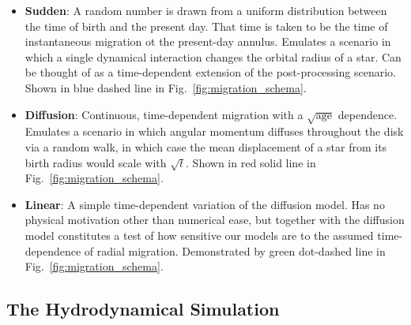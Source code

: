 \documentclass[a4paper, fleqn, usenatbib, useAMS]{mnras}
\begin{document}
\begin{itemize}
\begin{itemize}
		\item \textbf{Sudden}: A random number is drawn from a uniform 
		distribution between the time of birth and the present day. That time 
		is taken to be the time of instantaneous migration ot the present-day 
		annulus. Emulates a scenario in which a single dynamical interaction 
		changes the orbital radius of a star. Can be thought of as a 
		time-dependent extension of the post-processing scenario. Shown in 
		blue dashed line in Fig.~\ref{fig:migration_schema}. 

		\item \textbf{Diffusion}: Continuous, time-dependent migration with a 
		$\sqrt{\text{age}}$ dependence. Emulates a scenario in which angular 
		momentum diffuses throughout the disk via a random walk, in which 
		case the mean displacement of a star from its birth radius would 
		scale with $\sqrt{t}$. Shown in red solid line in 
		Fig.~\ref{fig:migration_schema}. 

		\item \textbf{Linear}: A simple time-dependent variation of the 
		diffusion model. Has no physical motivation other than numerical 
		ease, but together with the diffusion model constitutes a test of how 
		sensitive our models are to the assumed time-dependence of radial 
		migration. Demonstrated by green dot-dashed line in 
		Fig.~\ref{fig:migration_schema}. 
	\end{itemize} 
\end{itemize} 

\subsection{The Hydrodynamical Simulation} 
\label{sec:methods:h277} 
\end{document}
